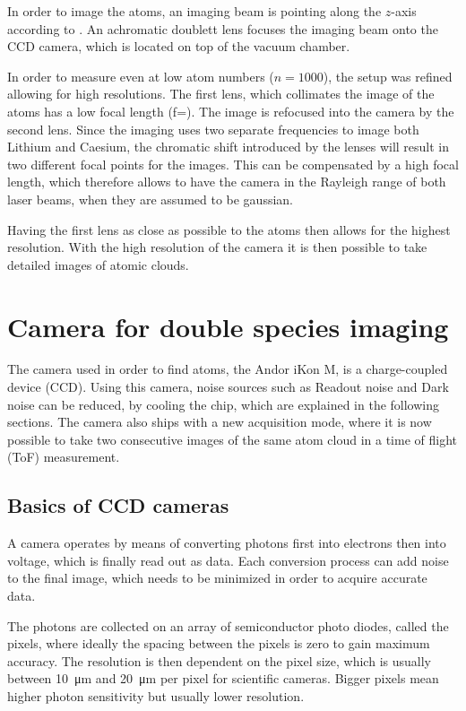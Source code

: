 In order to image the atoms, an imaging beam is pointing along the $z$-axis according to .
An achromatic doublett  lens focuses the imaging beam onto the CCD camera, which is located on top of the vacuum chamber.

In order to measure even at low atom numbers ($n=1000$), the setup was refined allowing for high resolutions. The first lens, which collimates the image of the atoms has a low focal length (f=).
The image is refocused into the camera by the second lens. Since the imaging uses two separate frequencies to image both Lithium and Caesium, the chromatic shift introduced by the lenses will result in two different focal points for the images. This can be compensated by a high focal length, which therefore allows to have the camera in the Rayleigh range of both laser beams, when they are assumed to be gaussian.

Having the first lens as close as possible to the atoms then allows for the highest resolution. With the high resolution of the camera it is then possible to take detailed images of atomic clouds.


\section{Camera for double species imaging}
\label{ch:camera}
The camera used in order to find atoms, the Andor iKon M\cite{andorManual}, is a charge-coupled device (CCD). Using this camera, noise sources such as Readout noise and Dark noise can be reduced, by cooling the chip, which are explained in the following sections. The camera also ships with a new acquisition mode, where it is now possible to take two consecutive images of the same atom cloud in a time of flight (ToF) measurement.

\subsection{Basics of CCD cameras}
\label{ch:ccd_basics}

A camera operates by means of converting photons first into electrons then into voltage, which is finally read out as data\cite{ccdoperationUrl}\cite{guppy38Bsheet}. Each conversion process can add noise to the final image, which needs to be minimized in order to acquire accurate data.

The photons are collected on an array of semiconductor photo diodes, called the pixels, where ideally the spacing between the pixels is zero to gain maximum accuracy. The resolution is then dependent on the pixel size, which is usually between \SI{10}{\micro\meter} and \SI{20}{\micro\meter} per pixel for scientific cameras. Bigger pixels mean higher photon sensitivity but usually lower resolution.

